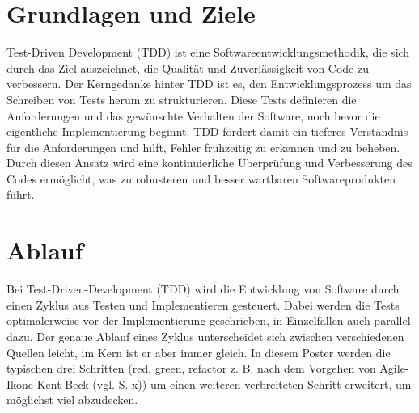 \documentclass[a0,landscape]{a0poster}
\newcommand{\gqq}[1]{\glqq #1\grqq}
\begin{document}
\begin{multicols}{4}



\color{DarkSlateGray} %

\section*{Grundlagen und Ziele}

Test-Driven Development (TDD) ist eine Softwareentwicklungsmethodik, die sich durch das Ziel auszeichnet, die Qualität und Zuverlässigkeit von Code zu verbessern. Der Kerngedanke hinter TDD ist es, den Entwicklungsprozess um das Schreiben von Tests herum zu strukturieren. Diese Tests definieren die Anforderungen und das gewünschte Verhalten der Software, noch bevor die eigentliche Implementierung beginnt. TDD fördert damit ein tieferes Verständnis für die Anforderungen und hilft, Fehler frühzeitig zu erkennen und zu beheben. Durch diesen Ansatz wird eine kontinuierliche Überprüfung und Verbesserung des Codes ermöglicht, was zu robusteren und besser wartbaren Softwareprodukten führt. \cite{ieee_tdd_2007}

\section*{Ablauf} %

Bei Test-Driven-Development (TDD) wird die Entwicklung von Software durch einen Zyklus aus Testen und Implementieren gesteuert.
Dabei werden die Tests optimalerweise vor der Implementierung geschrieben, in Einzelfällen auch parallel dazu.
Der genaue Ablauf eines Zyklus unterscheidet sich zwischen verschiedenen Quellen leicht, im Kern ist er aber immer gleich.
In diesem Poster werden die typischen drei Schritten (\gqq{red, green, refactor} z. B. nach dem Vorgehen von \gqq{Agile-Ikone} Kent Beck (vgl. \cite{beck_test_2022} S. x)) um einen weiteren verbreiteten Schritt erweitert, um möglichst viel abzudecken. 


\end{multicols}
\end{document}
